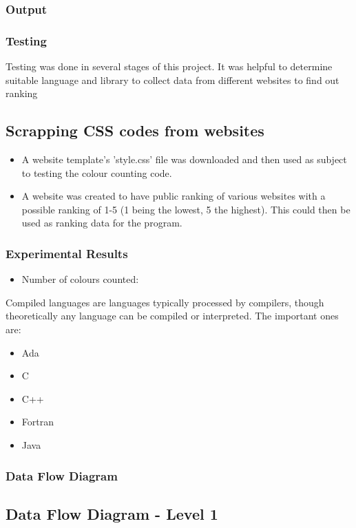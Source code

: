 \documentclass[11pt]{beamer}
\begin{document}
\begin{frame}
\frametitle{Output}
\end{frame}
\begin{frame}
\frametitle{Testing}
Testing was done in several stages of this project. It was helpful to determine suitable language and library to collect data from different websites to find out ranking\\
\subsection{Scrapping CSS codes from websites}
\begin{itemize}
	\item A website template's 'style.css' file was downloaded and then used as subject to testing the colour counting code.
	\item A website was created to have public ranking of various websites with a possible ranking of 1-5 (1 being the lowest, 5 the highest). This could then be used as ranking data for the program.
\end{itemize}
\end{frame}

\begin{frame}
\frametitle{Experimental Results}
\begin{itemize}
	\item Number of colours counted:
\end{itemize}
Compiled languages are languages typically processed by compilers, though theoretically any language can be compiled or interpreted. The important ones are:
\begin{itemize}
	\item Ada
	\item C
	\item C++
	\item Fortran
	\item Java
\end{itemize}
\end{frame}
\begin{frame}
\frametitle{Data Flow Diagram}
\end{frame}
\subsection{Data Flow Diagram - Level 1}
\end{document}
